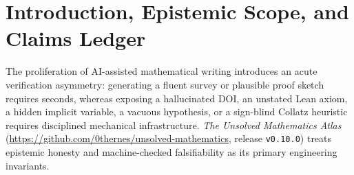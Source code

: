\documentclass[11pt,reqno]{amsart}
\theoremstyle{plain}
\theoremstyle{definition}
\newcommand{\code}[1]{{\upshape\nolinkurl{#1}}}
\begin{document}
\begin{abstract}
{Rust} Collatz accelerator and \textbf{Five-Vector Asymmetric Hydra} lab (fuzzed across 500,000
combined ASan/UBSan cases, 0 traps, 100\% bit-exact C17/Rust/Python parity), achieving
\textbf{1,683$\times$--7,137$\times$} wall-clock speedups ($t \le 26$: \textbf{884.4M} pairs in
$0.133$\,s; $d = 34$: \textbf{174.4M} DFS leaves in \textbf{4,096\,B} of stack), uncovering an
exact \textbf{Tropical Modular Mirror Law} ($\mu^*(2^a 3^b) = (a+b-1)/(a+b) \to 1$ vs.\
Archimedean box break $1/2 < \log_3 2 < 2/3$), a $+3.000$-bit carry-avalanche asymmetry, and the
$B \le 22$ Minimax Demon frontier ($0\%$ escape vs.\ $67.23\%$ for $3n-1$).
Fourth, Cross-Atlas auditing against \code{unsolved-problems-mega-atlas} (\texttt{v2.10.0},
2,000 problems) affirms \textbf{0/2,000} retirements across 56 archive entries, a daily sharded
mirror of all 26 Left to Solve programs (62,790 items) quarantines 4 unverified third-party
agent-claim review signals, and multi-cycle ten-class hardening achieves 104 passing tests,
10/10 mutation kill, 20/20 zero-error \code{mypy}, FAIR RO-Crate/Croissant metadata, and dual
RFC~3161 + Bitcoin OTS proofs over a 52-file SHA-256 manifest.
\textbf{No open conjecture in the catalog is claimed to be solved by this work.}
\end{abstract}

\maketitle

\section{Introduction, Epistemic Scope, and Claims Ledger}\label{sec:intro}

The proliferation of AI-assisted mathematical writing introduces an acute verification
asymmetry: generating a fluent survey or plausible proof sketch requires seconds, whereas
exposing a hallucinated DOI, an unstated Lean axiom, a hidden implicit variable, a vacuous
hypothesis, or a sign-blind Collatz heuristic requires disciplined mechanical infrastructure.
\emph{The Unsolved Mathematics Atlas} (\url{https://github.com/0thernes/unsolved-mathematics},
release \texttt{v0.10.0}) treats epistemic honesty and machine-checked falsifiability as its
primary engineering invariants.
\end{document}
